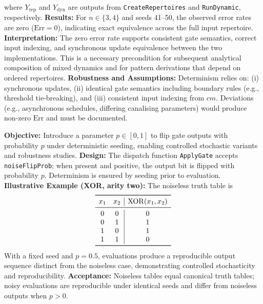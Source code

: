 where \(Y_{\mathrm{rep}}\) and \(Y_{\mathrm{dyn}}\) are outputs from \texttt{CreateRepertoires} and \texttt{RunDynamic}, respectively.
\textbf{Results:} For \(n\in\{3,4\}\) and seeds 41–50, the observed error rates are zero (\(\mathrm{Err}=0\)), indicating exact equivalence across the full input repertoire.
\textbf{Interpretation:} The zero error rate supports consistent gate semantics, correct input indexing, and synchronous update equivalence between the two implementations. This is a necessary precondition for subsequent analytical composition of mixed dynamics and for pattern derivations that depend on ordered repertoires.
\textbf{Robustness and Assumptions:} Determinism relies on: (i) synchronous updates, (ii) identical gate semantics including boundary rules (e.g., threshold tie-breaking), and (iii) consistent input indexing from \(cm\). Deviations (e.g., asynchronous schedules, differing canalising parameters) would produce non-zero \(\mathrm{Err}\) and must be documented.

\textbf{Objective:} Introduce a parameter \(p\in[0,1]\) to flip gate outputs with probability \(p\) under deterministic seeding, enabling controlled stochastic variants and robustness studies.
\textbf{Design:} The dispatch function \texttt{ApplyGate} accepts \texttt{noiseFlipProb}; when present and positive, the output bit is flipped with probability \(p\). Determinism is ensured by seeding prior to evaluation.
\textbf{Illustrative Example (XOR, arity two):} The noiseless truth table is
\[
\begin{array}{cc|c}
\toprule
 x_1 & x_2 & \mathrm{XOR}(x_1,x_2) \\
\midrule
 0 & 0 & 0 \\
 0 & 1 & 1 \\
 1 & 0 & 1 \\
 1 & 1 & 0 \\
\bottomrule
\end{array}
\]
With a fixed seed and \(p=0.5\), evaluations produce a reproducible output sequence distinct from the noiseless case, demonstrating controlled stochasticity and reproducibility.
\textbf{Acceptance:} Noiseless tables equal canonical truth tables; noisy evaluations are reproducible under identical seeds and differ from noiseless outputs when \(p>0\).

